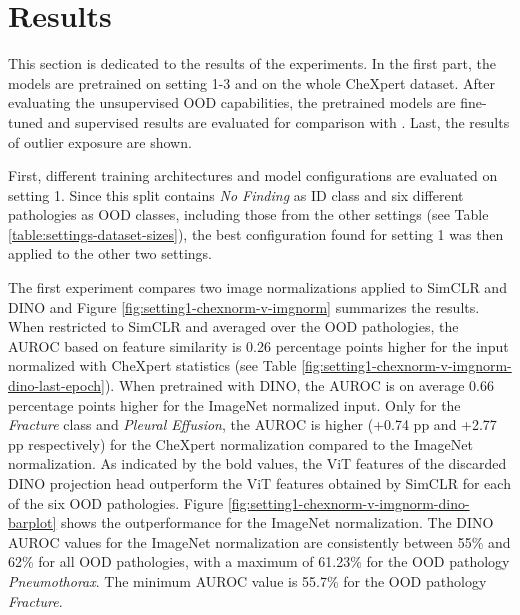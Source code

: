 \section{Results}
\label{section: results}
This section is dedicated to the results of the experiments.
In the first part, the models are pretrained on setting 1-3 and on the whole CheXpert dataset.
After evaluating the unsupervised OOD capabilities, the pretrained models are fine-tuned and supervised results are evaluated for comparison with \citep{Berger2021}.
Last, the results of outlier exposure are shown.
\par
First, different training architectures and model configurations are evaluated on setting 1.
Since this split contains \textit{No Finding} as ID class and six different pathologies as OOD classes, including those from the other settings (see Table \ref{table:settings-dataset-sizes}), the best configuration found for setting 1 was then applied to the other two settings.
\par
The first experiment compares two image normalizations applied to SimCLR and DINO and Figure \ref{fig:setting1-chexnorm-v-imgnorm} summarizes the results.
When restricted to SimCLR and averaged over the OOD pathologies, the AUROC based on feature similarity is 0.26 percentage points higher for the input normalized with CheXpert statistics (see Table \ref{fig:setting1-chexnorm-v-imgnorm-dino-last-epoch}).
When pretrained with DINO, the AUROC is on average 0.66 percentage points higher for the ImageNet normalized input.
Only for the \textit{Fracture} class and \textit{Pleural Effusion}, the AUROC is higher (+0.74 pp and +2.77 pp respectively) for the CheXpert normalization compared to the ImageNet normalization.
As indicated by the bold values, the ViT features of the discarded DINO projection head outperform the ViT features obtained by SimCLR for each of the six OOD pathologies.
Figure \ref{fig:setting1-chexnorm-v-imgnorm-dino-barplot} shows the outperformance for the ImageNet normalization.
The DINO AUROC values for the ImageNet normalization are consistently between 55\% and 62\% for all OOD pathologies, with a maximum of 61.23\% for the OOD pathology \textit{Pneumothorax}.
The minimum AUROC value is 55.7\% for the OOD pathology \textit{Fracture}.
